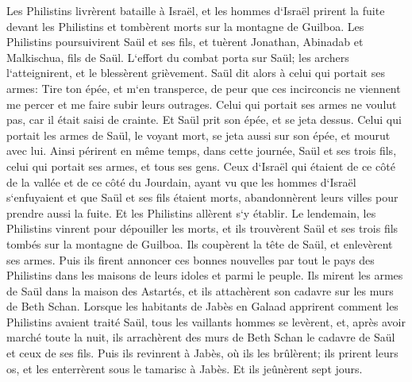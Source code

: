 \verse Les Philistins livrèrent bataille à Israël, et les hommes d`Israël prirent la fuite devant les Philistins et tombèrent morts sur la montagne de Guilboa. 
\verse Les Philistins poursuivirent Saül et ses fils, et tuèrent Jonathan, Abinadab et Malkischua, fils de Saül. 
\verse L`effort du combat porta sur Saül; les archers l`atteignirent, et le blessèrent grièvement. 
\verse Saül dit alors à celui qui portait ses armes: Tire ton épée, et m`en transperce, de peur que ces incirconcis ne viennent me percer et me faire subir leurs outrages. Celui qui portait ses armes ne voulut pas, car il était saisi de crainte. Et Saül prit son épée, et se jeta dessus. 
\verse Celui qui portait les armes de Saül, le voyant mort, se jeta aussi sur son épée, et mourut avec lui. 
\verse Ainsi périrent en même temps, dans cette journée, Saül et ses trois fils, celui qui portait ses armes, et tous ses gens. 
\verse Ceux d`Israël qui étaient de ce côté de la vallée et de ce côté du Jourdain, ayant vu que les hommes d`Israël s`enfuyaient et que Saül et ses fils étaient morts, abandonnèrent leurs villes pour prendre aussi la fuite. Et les Philistins allèrent s`y établir. 
\verse Le lendemain, les Philistins vinrent pour dépouiller les morts, et ils trouvèrent Saül et ses trois fils tombés sur la montagne de Guilboa. 
\verse Ils coupèrent la tête de Saül, et enlevèrent ses armes. Puis ils firent annoncer ces bonnes nouvelles par tout le pays des Philistins dans les maisons de leurs idoles et parmi le peuple. 
\verse Ils mirent les armes de Saül dans la maison des Astartés, et ils attachèrent son cadavre sur les murs de Beth Schan. 
\verse Lorsque les habitants de Jabès en Galaad apprirent comment les Philistins avaient traité Saül, 
\verse tous les vaillants hommes se levèrent, et, après avoir marché toute la nuit, ils arrachèrent des murs de Beth Schan le cadavre de Saül et ceux de ses fils. Puis ils revinrent à Jabès, où ils les brûlèrent; 
\verse ils prirent leurs os, et les enterrèrent sous le tamarisc à Jabès. Et ils jeûnèrent sept jours. 
